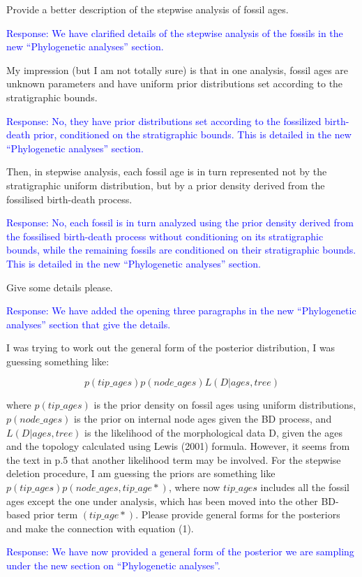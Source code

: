 \documentclass[11pt]{article}
\newcommand{\response}[1]{\medskip{}\textcolor{blue}{{Response: #1}}\medskip{}}
\begin{document}
Provide a better description of the stepwise analysis of fossil ages. 

\response{We have clarified details of the stepwise analysis of the fossils in the new ``Phylogenetic analyses'' section.}

My impression (but I am not totally sure) is that in one analysis, fossil ages are unknown parameters and have uniform prior distributions set according to the stratigraphic bounds. 

\response{No, they have prior distributions set according to the fossilized birth-death prior, conditioned on the stratigraphic bounds. This is detailed in the new ``Phylogenetic analyses'' section. }

Then, in stepwise analysis, each fossil age is in turn represented not by the stratigraphic uniform distribution, but by a prior density derived from the fossilised birth-death process.

\response{No, each fossil is in turn analyzed using the prior density derived from the fossilised birth-death process without conditioning on its stratigraphic bounds, while the remaining fossils are conditioned on their stratigraphic bounds. This is detailed in the new ``Phylogenetic analyses'' section. }

 Give some details please.
 
 \response{We have added the opening three paragraphs in the new ``Phylogenetic analyses'' section that give the details.}
 
  I was trying to work out the general form of the posterior distribution, I was guessing something like:

$$p(tip\_ages) p(node\_ages) L(D|ages,tree)$$

where $p(tip\_ages)$ is the prior density on fossil ages using uniform distributions, $p(node\_ages)$ is the prior on internal node ages given the BD process, and $L(D|ages,tree)$ is the likelihood of the morphological data D, given the ages and the topology calculated using Lewis (2001) formula. However, it seems from the text in p.5 that another likelihood term may be involved. For the stepwise deletion procedure, I am guessing the priors are something like $p(tip\_ages\hat{}) p(node\_ages, tip\_age*)$, where now $tip\_ages\hat{}$ includes all the fossil ages except the one under analysis, which has been moved into the other BD-based prior term $(tip\_age*)$. Please provide general forms for the posteriors and make the connection with equation (1).

\response{We have now provided a general form of the posterior we are sampling under the new section on ``Phylogenetic analyses''. }
\end{document}
